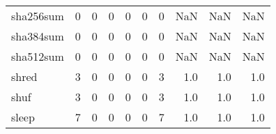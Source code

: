 \begin{tabular}{lrrrrrrrrr}
sha256sum &                                       0 &                                                  0 &                                                  0 &                                                  0 &                                                  0 &                                                  0 &                                                NaN &                                    NaN &                                  NaN \\
sha384sum &                                       0 &                                                  0 &                                                  0 &                                                  0 &                                                  0 &                                                  0 &                                                NaN &                                    NaN &                                  NaN \\
sha512sum &                                       0 &                                                  0 &                                                  0 &                                                  0 &                                                  0 &                                                  0 &                                                NaN &                                    NaN &                                  NaN \\
shred     &                                       3 &                                                  0 &                                                  0 &                                                  0 &                                                  0 &                                                  3 &                                                1.0 &                                    1.0 &                                  1.0 \\
shuf      &                                       3 &                                                  0 &                                                  0 &                                                  0 &                                                  0 &                                                  3 &                                                1.0 &                                    1.0 &                                  1.0 \\
sleep     &                                       7 &                                                  0 &                                                  0 &                                                  0 &                                                  0 &                                                  7 &                                                1.0 &                                    1.0 &                                  1.0 \\

\end{tabular}
